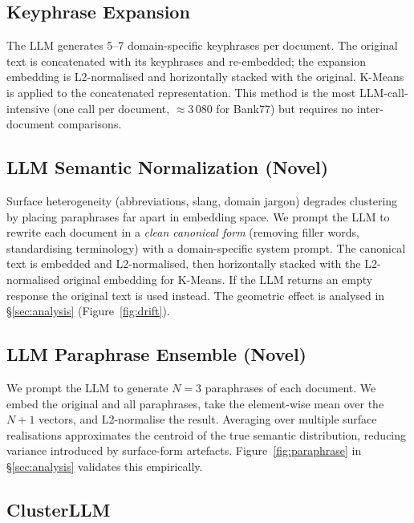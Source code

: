 \documentclass[10pt,twocolumn,a4paper]{article}
\begin{document}
\subsection{Keyphrase Expansion}

The LLM generates 5--7 domain-specific keyphrases per document.
The original text is concatenated with its keyphrases and re-embedded; the
expansion embedding is L2-normalised and horizontally stacked with the original.
K-Means is applied to the concatenated representation.
This method is the most LLM-call-intensive (one call per document,
$\approx$3\,080 for Bank77) but requires no inter-document comparisons.

\subsection{\textbf{LLM Semantic Normalization} \textnormal{(Novel)}}
\label{sec:normalization}

Surface heterogeneity (abbreviations, slang, domain jargon) degrades
clustering by placing paraphrases far apart in embedding space.
We prompt the LLM to rewrite each document in a \emph{clean canonical form}
(removing filler words, standardising terminology) with a domain-specific
system prompt.
The canonical text is embedded and L2-normalised, then horizontally stacked
with the L2-normalised original embedding for K-Means.
If the LLM returns an empty response the original text is used instead.
The geometric effect is analysed in \S\ref{sec:analysis} (Figure~\ref{fig:drift}).

\subsection{\textbf{LLM Paraphrase Ensemble} \textnormal{(Novel)}}
\label{sec:paraphrase}

We prompt the LLM to generate $N{=}3$ paraphrases of each document.
We embed the original and all paraphrases, take the element-wise mean over
the $N{+}1$ vectors, and L2-normalise the result.
Averaging over multiple surface realisations approximates the centroid of
the true semantic distribution, reducing variance introduced by surface-form
artefacts.
Figure~\ref{fig:paraphrase} in \S\ref{sec:analysis} validates this empirically.

\subsection{ClusterLLM}
\label{sec:clusterllm}
\end{document}
